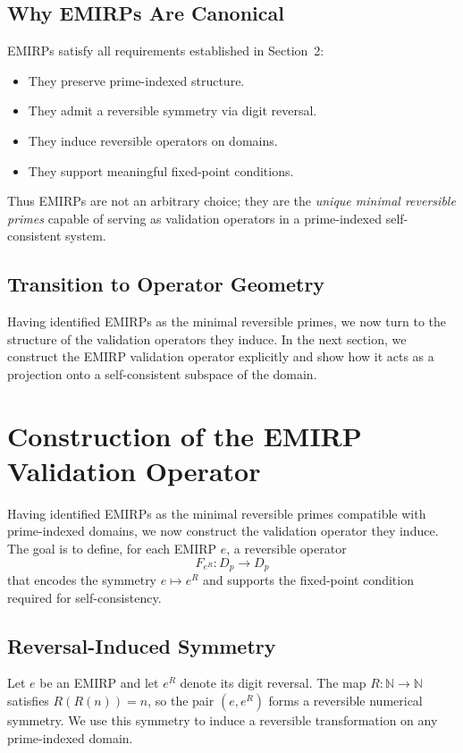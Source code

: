 \documentclass[11pt]{article}
\theoremstyle{definition}
\theoremstyle{plain}
\theoremstyle{remark}
\begin{document}
\subsection{Why EMIRPs Are Canonical}

EMIRPs satisfy all requirements established in Section~2:

\begin{itemize}
    \item They preserve prime-indexed structure.
    \item They admit a reversible symmetry via digit reversal.
    \item They induce reversible operators on domains.
    \item They support meaningful fixed-point conditions.
\end{itemize}

Thus EMIRPs are not an arbitrary choice; they are the \emph{unique
minimal reversible primes} capable of serving as validation operators in
a prime-indexed self-consistent system.

\subsection{Transition to Operator Geometry}

Having identified EMIRPs as the minimal reversible primes, we now turn
to the structure of the validation operators they induce. In the next
section, we construct the EMIRP validation operator explicitly and show
how it acts as a projection onto a self-consistent subspace of the
domain.

\section{Construction of the EMIRP Validation Operator}

Having identified EMIRPs as the minimal reversible primes compatible with
prime-indexed domains, we now construct the validation operator they
induce. The goal is to define, for each EMIRP $e$, a reversible operator
\[
F_{e^R} : D_p \to D_p
\]
that encodes the symmetry $e \mapsto e^R$ and supports the fixed-point
condition required for self-consistency.

\subsection{Reversal-Induced Symmetry}

Let $e$ be an EMIRP and let $e^R$ denote its digit reversal. The map
$R : \mathbb{N} \to \mathbb{N}$ satisfies $R(R(n)) = n$, so the pair
$(e, e^R)$ forms a reversible numerical symmetry. We use this symmetry
to induce a reversible transformation on any prime-indexed domain.
\end{document}
